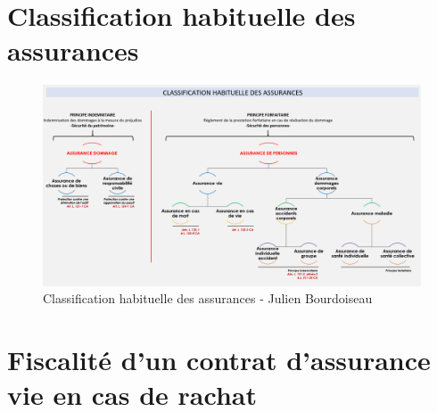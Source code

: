 \documentclass{article}
\begin{document}
\afterpage{\null\newpage}


\appendix


\section{Classification habituelle des assurances}
\label{appendix:classification-assurances}

\begin{figure}[h!]
    \center
    \includegraphics[scale=0.6]{resources/classification-assurances.png}
    \caption{
        \label{classification-assurances} Classification habituelle des assurances - Julien Bourdoiseau
    }
\end{figure}

\newpage
{}
\section{Fiscalité d'un contrat d'assurance vie en cas de rachat}
\label{appendix:fiscalite-vie}
\end{document}
